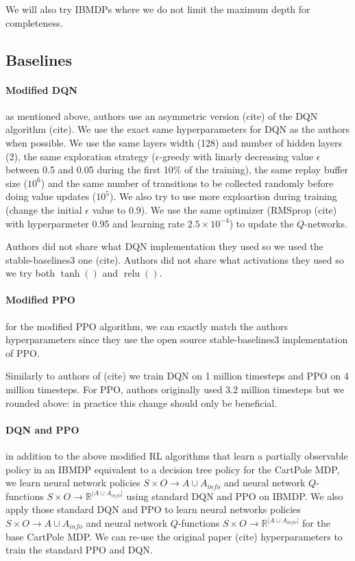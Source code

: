 We will also try IBMDPs where we do not limit the maximum depth for completeness.

\subsection{Baselines}
\paragraph{Modified DQN} as mentioned above, authors use an asymmetric version (cite) of the DQN algorithm (cite).
We use the exact same hyperparameters for DQN as the authors when possible. 
We use the same layers width (128) and number of hidden layers (2), the same exploration strategy ($\epsilon$-greedy with linarly decreasing value $\epsilon$ between 0.5 and 0.05 during the first 10\% of the training),
the same replay buffer size ($10^6$) and the same number of transitions to be collected randomly before doing value updates ($10^5$).
We also try to use more exploartion during training (change the initial $\epsilon$ value to 0.9).
We use the same optimizer (RMSprop (cite) with hyperparmeter 0.95 and learning rate $2.5 \times 10^{-4}$) to update the $Q$-networks.

Authors did not share what DQN implementation they used so we used the stable-baselines3 one (cite).
Authors did not share what activations they used so we try both $\operatorname{tanh}()$ and $\operatorname{relu}()$. 

\paragraph{Modified PPO} for the modified PPO algorithm, we can exactly match the authors hyperparameters since they use the open source stable-baselines3 implementation of PPO.

Similarly to authors of (cite) we train DQN on 1 million timesteps and PPO on 4 million timesteps. For PPO, authors originally used 3.2 million timesteps but we rounded above: in practice this change should only be beneficial.

\paragraph{DQN and PPO} in addition to the above modified RL algorithms that learn a partially observable policy in an IBMDP equivalent to a decision tree policy for the CartPole MDP, we learn neural network policies $S\times O \rightarrow A\cup A_{info}$ and neural network $Q$-functions $S\times O \rightarrow \mathbb{R}^{|A\cup A_{info}|}$ using standard DQN and PPO on IBMDP.
We also apply those standard DQN and PPO to learn neural networks policies $S\times O \rightarrow A\cup A_{info}$ and neural network $Q$-functions $S\times O \rightarrow \mathbb{R}^{|A\cup A_{info}|}$ for the base CartPole MDP.
We can re-use the original paper (cite) hyperparameters to train the standard PPO and DQN. 


